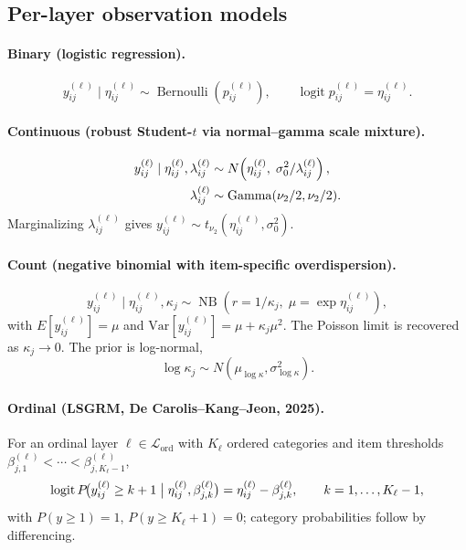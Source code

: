 \documentclass[11pt]{article}
\DeclareMathOperator{\logit}{logit}
\DeclareMathOperator{\GammaDist}{Gamma}
\DeclareMathOperator{\Bern}{Bernoulli}
\DeclareMathOperator{\NB}{NB}
\begin{document}
\subsection{Per-layer observation models}

\paragraph{Binary (logistic regression).}
\begin{equation}
    y_{ij}^{(\ell)}\mid \eta_{ij}^{(\ell)}\sim
    \Bern(p_{ij}^{(\ell)}),
    \qquad \logit p_{ij}^{(\ell)}=\eta_{ij}^{(\ell)}.
\end{equation}

\paragraph{Continuous (robust Student-$t$ via normal--gamma scale mixture).}
\begin{align}
    y_{ij}^{(\ell)}\mid \eta_{ij}^{(\ell)},\lambda_{ij}^{(\ell)}
    &\sim N\!\left(\eta_{ij}^{(\ell)},\;\sigma_0^2/\lambda_{ij}^{(\ell)}\right),\notag\\
    \lambda_{ij}^{(\ell)}
    &\sim \GammaDist(\nu_2/2,\nu_2/2).
\end{align}
Marginalizing $\lambda_{ij}^{(\ell)}$ gives
$y_{ij}^{(\ell)}\sim t_{\nu_2}(\eta_{ij}^{(\ell)},\sigma_0^2)$.

\paragraph{Count (negative binomial with item-specific overdispersion).}
\begin{equation}
    y_{ij}^{(\ell)}\mid \eta_{ij}^{(\ell)},\kappa_j
    \sim \NB\!\left(r=1/\kappa_j,\;\mu=\exp\eta_{ij}^{(\ell)}\right),
\end{equation}
with $E[y_{ij}^{(\ell)}]=\mu$ and $\mathrm{Var}[y_{ij}^{(\ell)}]=\mu+\kappa_j\mu^2$.
The Poisson limit is recovered as $\kappa_j\to 0$.  The prior is log-normal,
\begin{equation}
    \log\kappa_j\sim N(\mu_{\log\kappa},\sigma_{\log\kappa}^2).
\end{equation}

\paragraph{Ordinal (LSGRM, De Carolis--Kang--Jeon, 2025).}
For an ordinal layer $\ell\in\mathcal L_{\mathrm{ord}}$ with $K_\ell$ ordered
categories and item thresholds
$\beta_{j,1}^{(\ell)}<\cdots<\beta_{j,K_\ell-1}^{(\ell)}$,
\begin{equation}
    \logit P\!\bigl(y_{ij}^{(\ell)}\geq k+1\bigm|\eta_{ij}^{(\ell)},\beta_{j,k}^{(\ell)}\bigr)
    =\eta_{ij}^{(\ell)}-\beta_{j,k}^{(\ell)},
    \qquad k=1,\dots,K_\ell-1,
\end{equation}
with $P(y\geq 1)=1$, $P(y\geq K_\ell+1)=0$; category probabilities follow by
differencing.
\end{document}
